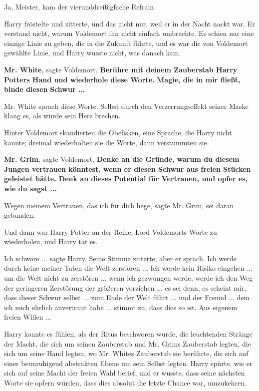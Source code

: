 \glqq{}Ja, Meister\grqq{}, kam der vierunddreißigfache Refrain.

Harry fröstelte und zitterte, und das nicht nur, weil er in der Nacht nackt war.
Er verstand nicht, warum Voldemort ihn nicht einfach umbrachte. Es schien nur
eine einzige Linie zu geben, die in die Zukunft führte, und es war die von
Voldemort gewählte Linie, und Harry wusste nicht, was danach kam.

\glqq{}\textbf{Mr. White}\grqq{}, sagte Voldemort. \glqq{}\textbf{Berühre mit
deinem Zauberstab Harry Potters Hand und wiederhole diese Worte.} \textbf{Magie,
die in mir fließt, binde diesen} \textbf{Schwur ...}\grqq{}

Mr. White sprach diese Worte. Selbst durch den Verzerrungseffekt seiner Maske
klang es, als würde sein Herz brechen.

Hinter Voldemort skandierten die Obelisken, eine Sprache, die Harry nicht
kannte; dreimal wiederholten sie die Worte, dann verstummten sie.

\glqq{}\textbf{Mr. Grim}\grqq{}, sagte Voldemort. \glqq{}\textbf{Denke an die
Gründe, warum du diesem Jungen vertrauen könntest, wenn er diesen Schwur aus
freien Stücken geleistet hätte. Denk an dieses Potential für Vertrauen, und
opfer es, wie du sagst ...}\grqq{}

\glqq{}Wegen meinem Vertrauen, das ich für dich hege\grqq{}, sagte Mr. Grim,
\glqq{}sei daran gebunden.\grqq{}

Und dann war Harry Potter an der Reihe, Lord Voldemorts Worte zu wiederholen,
und Harry tat es.

\glqq{}Ich schwöre ...\grqq{} sagte Harry. Seine Stimme zitterte, aber er sprach.
\glqq{}Ich werde durch keine meiner Taten die Welt zerstören ... Ich werde kein
Risiko eingehen ... um die Welt nicht zu zerstören ... wenn ich gezwungen werde,
werde ich den Weg der geringeren Zerstörung der größeren vorziehen ... es sei
denn, es scheint mir, dass dieser Schwur selbst ... zum Ende der Welt führt ...
und der Freund ... dem ich mich ehrlich anvertraut habe ... stimmt zu, dass dies
so ist. Aus eigenem freien Willen ...\grqq{}

Harry konnte es fühlen, als der Ritus beschworen wurde, die leuchtenden Stränge
der Macht, die sich um seinen Zauberstab und Mr. Grims Zauberstab legten, die
sich um seine Hand legten, wo Mr. Whites Zauberstab sie berührte, die sich auf
einer beunruhigend abstrakten Ebene um sein Selbst legten. Harry spürte, wie er
sich auf seine Macht der freien Wahl berief, und er wusste, dass seine nächsten
Worte sie opfern würden, dass dies absolut die letzte Chance war, umzukehren.

